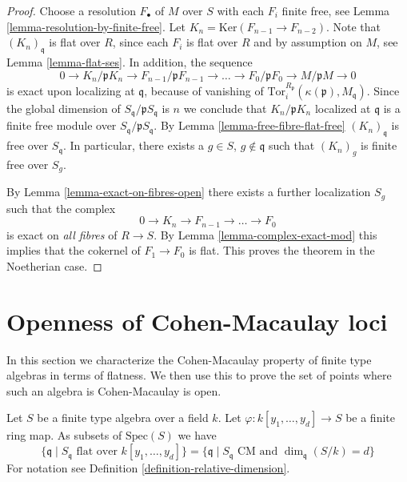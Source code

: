 \begin{proof}
\medskip\noindent
Choose a resolution $F_\bullet$ of $M$ over $S$ with each
$F_i$ finite free, see Lemma \ref{lemma-resolution-by-finite-free}.
Let $K_n = \text{Ker}(F_{n-1} \to F_{n-2})$. Note that
$(K_n)_{\mathfrak q}$ is flat over $R$, since each $F_i$
is flat over $R$ and by assumption on $M$, see Lemma
\ref{lemma-flat-ses}. In addition, the sequence
$$
0 \to
K_n/\mathfrak p K_n \to
F_{n-1}/ \mathfrak p F_{n-1} \to
\ldots \to
F_0 / \mathfrak p F_0 \to
M/\mathfrak p M \to
0
$$
is exact upon localizing at $\mathfrak q$, because of vanishing
of $\text{Tor}_i^{R_\mathfrak p}(\kappa(\mathfrak p), M_{\mathfrak q})$.
Since the global dimension of $S_\mathfrak q/\mathfrak p S_{\mathfrak q}$
is $n$ we conclude that $K_n / \mathfrak p K_n$ localized
at $\mathfrak q$ is a finite free module over
$S_\mathfrak q/\mathfrak p S_{\mathfrak q}$. By
Lemma \ref{lemma-free-fibre-flat-free} $(K_n)_{\mathfrak q}$
is free over $S_{\mathfrak q}$. In particular, there exists a
$g \in S$, $g \not \in \mathfrak q$ such that $(K_n)_g$
is finite free over $S_g$.

\medskip\noindent
By Lemma \ref{lemma-exact-on-fibres-open}
there exists a further localization $S_g$ such that
the complex
$$
0 \to K_n \to F_{n-1} \to \ldots \to F_0
$$
is exact on {\it all fibres} of $R \to S$. By
Lemma \ref{lemma-complex-exact-mod}
this implies that the cokernel of $F_1 \to F_0$ is
flat. This proves the theorem in the Noetherian case.
\end{proof}










\section{Openness of Cohen-Macaulay loci}
\label{section-CM-open}

\noindent
In this section we characterize the Cohen-Macaulay property
of finite type algebras in terms of flatness. We then use this
to prove the set of points where such an algebra is Cohen-Macaulay
is open.

\begin{lemma}
\label{lemma-where-CM}
Let $S$ be a finite type algebra over a field $k$.
Let $\varphi : k[y_1, \ldots, y_d] \to S$ be a finite ring map.
As subsets of $\text{Spec}(S)$ we have
$$
\{ \mathfrak q \mid
S_{\mathfrak q} \text{ flat over }k[y_1, \ldots, y_d]\}
=
\{ \mathfrak q \mid
S_{\mathfrak q} \text{ CM and }\dim_{\mathfrak q}(S/k) = d\}
$$
For notation see Definition \ref{definition-relative-dimension}.
\end{lemma}

